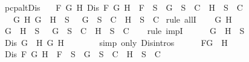 \begin{isabellebody}
\isanewline
%
\endisadelimproof
\isanewline
{}\isamarkupfalse%
\ pcp{\isacharunderscore}alt{}Dis{}{\isacharcolon}\isanewline
\ \ \ {\isachardoublequoteopen}{\isasymforall}F\ G\ H{\isachardot}\ Dis\ F\ G\ H\ {\isasymlongrightarrow}\ F\ {\isasymin}\ S\ {\isasymlongrightarrow}\ {\isacharbraceleft}G{\isacharbraceright}\ {\isasymunion}\ S\ {\isasymin}\ C\ {\isasymor}\ {\isacharbraceleft}H{\isacharbraceright}\ {\isasymunion}\ S\ {\isasymin}\ C{\isachardoublequoteclose}\isanewline
\ \ \ {\isachardoublequoteopen}{\isasymforall}G\ H{\isachardot}\ G\ \isactrlbold {\isasymrightarrow}\ H\ {\isasymin}\ S\ {\isasymlongrightarrow}\ {\isacharbraceleft}\isactrlbold {\isasymnot}\ G{\isacharbraceright}\ {\isasymunion}\ S\ {\isasymin}\ C\ {\isasymor}\ {\isacharbraceleft}H{\isacharbraceright}\ {\isasymunion}\ S\ {\isasymin}\ C{\isachardoublequoteclose}\isanewline
%
\isadelimproof
%
\endisadelimproof
%
\isatagproof
{}\isamarkupfalse%
\ {\isacharparenleft}rule\ allI{\isacharparenright}{\isacharplus}\isanewline
\ \ \isamarkupfalse%
\ G\ H\isanewline
\ \ \isamarkupfalse%
\ {\isachardoublequoteopen}G\ \isactrlbold {\isasymrightarrow}\ H\ {\isasymin}\ S\ {\isasymlongrightarrow}\ {\isacharbraceleft}\isactrlbold {\isasymnot}\ G{\isacharbraceright}\ {\isasymunion}\ S\ {\isasymin}\ C\ {\isasymor}\ {\isacharbraceleft}H{\isacharbraceright}\ {\isasymunion}\ S\ {\isasymin}\ C{\isachardoublequoteclose}\isanewline
\ \ \isamarkupfalse%
\ {\isacharparenleft}rule\ impI{\isacharparenright}\isanewline
\ \ \ \ \isamarkupfalse%
\ {\isachardoublequoteopen}G\ \isactrlbold {\isasymrightarrow}\ H\ {\isasymin}\ S{\isachardoublequoteclose}\isanewline
\ \ \ \ \isamarkupfalse%
\ \isamarkupfalse%
\ {\isachardoublequoteopen}Dis\ {\isacharparenleft}G\ \isactrlbold {\isasymrightarrow}\ H{\isacharparenright}\ {\isacharparenleft}\isactrlbold {\isasymnot}G{\isacharparenright}\ H{\isachardoublequoteclose}\isanewline
\ \ \ \ \ \ \isamarkupfalse%
\ {\isacharparenleft}simp\ only{\isacharcolon}\ Dis{\isachardot}intros{\isacharparenleft}{}{\isacharparenright}{\isacharparenright}\isanewline
\ \ \ \ \isamarkupfalse%
\ {\isacharquery}F{\isacharequal}{\isachardoublequoteopen}G\ \isactrlbold {\isasymrightarrow}\ H{\isachardoublequoteclose}\ \isanewline
\ \ \ \ \isamarkupfalse%
\ {\isachardoublequoteopen}Dis\ {\isacharquery}F\ {\isacharparenleft}\isactrlbold {\isasymnot}G{\isacharparenright}\ H\ {\isasymlongrightarrow}\ {\isacharquery}F\ {\isasymin}\ S\ {\isasymlongrightarrow}\ {\isacharbraceleft}\isactrlbold {\isasymnot}G{\isacharbraceright}\ {\isasymunion}\ S\ {\isasymin}\ C\ {\isasymor}\ {\isacharbraceleft}H{\isacharbraceright}\ {\isasymunion}\ S\ {\isasymin}\ C{\isachardoublequoteclose}\isanewline

\end{isabellebody}
